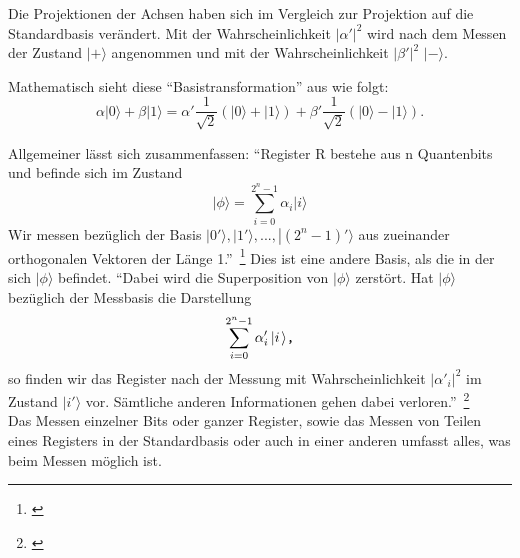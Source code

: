 Die Projektionen der Achsen haben sich im Vergleich zur Projektion auf die Standardbasis verändert. Mit der Wahrscheinlichkeit $\left|\alpha'\right|^2$ wird nach dem Messen der Zustand $\left|+\right.\rangle$ angenommen und mit der Wahrscheinlichkeit $\left|\beta'\right|^2$ $\left|-\right.\rangle$. 

Mathematisch sieht diese ``Basistransformation'' aus wie folgt:
\begin{equation}
    \alpha\left|0\right.\rangle+\beta\left|1\right.\rangle=\alpha'\frac{1}{\sqrt{2}}\left(\left|0\right.\rangle+\left|1\right.\rangle\right)+\beta'\frac{1}{\sqrt{2}}\left(\left|0\right.\rangle-\left|1\right.\rangle\right).
\end{equation}


Allgemeiner lässt sich zusammenfassen: ``Register R bestehe aus n Quantenbits und befinde sich im Zustand
$$\left|\phi\right.\rangle=\sum_{i=0}^{2^n-1}\alpha_i\left|i\right.\rangle$$
Wir messen bezüglich der Basis
$\left|0'\right.\rangle,\left|1'\right.\rangle,...,\left|(2^n-1)'\right.\rangle$
aus zueinander orthogonalen Vektoren der Länge 1.''\ \footnote{\cite[S. 46]{homeister_quantum_2022}} Dies ist eine andere Basis, als die in der sich $\left|\phi\right.\rangle$ befindet. ``Dabei wird die Superposition von $\left|\phi\right.\rangle$ zerstört. Hat $\left|\phi\right.\rangle$ bezüglich der Messbasis die Darstellung
$$\sum_{i=0}^{2^n-1}\alpha'_i\left|i\right.\rangle\verb|,|$$
so finden wir das Register nach der Messung mit Wahrscheinlichkeit $\left|\alpha'_i\right|^2$ im Zustand $\left|i'\right.\rangle$ vor.  Sämtliche anderen Informationen gehen dabei
verloren.''\ \footnote{\cite[S. 46]{homeister_quantum_2022}}\\

Das Messen einzelner Bits oder ganzer Register, sowie das Messen von Teilen eines Registers in der Standardbasis oder auch in einer anderen umfasst alles, was beim Messen möglich ist.

